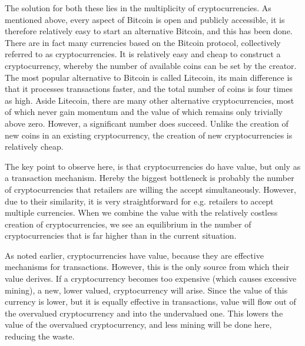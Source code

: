The solution for both these lies in the multiplicity of cryptocurrencies.
As mentioned above, every aspect of Bitcoin is open and publicly accessible,
it is therefore relatively easy to start an alternative Bitcoin, and
this has been done. There are in fact many currencies based on the
Bitcoin protocol, collectively referred to as cryptocurrencies. It
is relatively easy and cheap to construct a cryptocurrency, whereby
the number of available coins can be set by the creator. The most
popular alternative to Bitcoin is called Litecoin, its main difference
is that it processes transactions faster, and the total number of
coins is four times as high. Aside Litecoin, there are many other
alternative cryptocurrencies, most of which never gain momentum and
the value of which remains only trivially above zero. However, a significant
number does succeed. Unlike the creation of new coins in an existing
cryptocurrency, the creation of new cryptocurrencies is relatively
cheap.

The key point to observe here, is that cryptocurrencies do have value,
but only as a transaction mechanism. Hereby the biggest bottleneck
is probably the number of cryptocurrencies that retailers are willing
the accept simultaneously. However, due to their similarity, it is
very straightforward for e.g. retailers to accept multiple currencies.
When we combine the value with the relatively costless creation of
cryptocurrencies, we see an equilibrium in the number of cryptocurrencies
that is far higher than in the current situation.

As noted earlier, cryptocurrencies have value, because they are effective
mechanisms for transactions. However, this is the only source from
which their value derives. If a cryptocurrency becomes too expensive
(which causes excessive mining), a new, lower valued, cryptocurrency
will arise. Since the value of this currency is lower, but it is equally
effective in transactions, value will flow out of the overvalued cryptocurrency
and into the undervalued one. This lowers the value of the overvalued
cryptocurrency, and less mining will be done here, reducing the waste.
